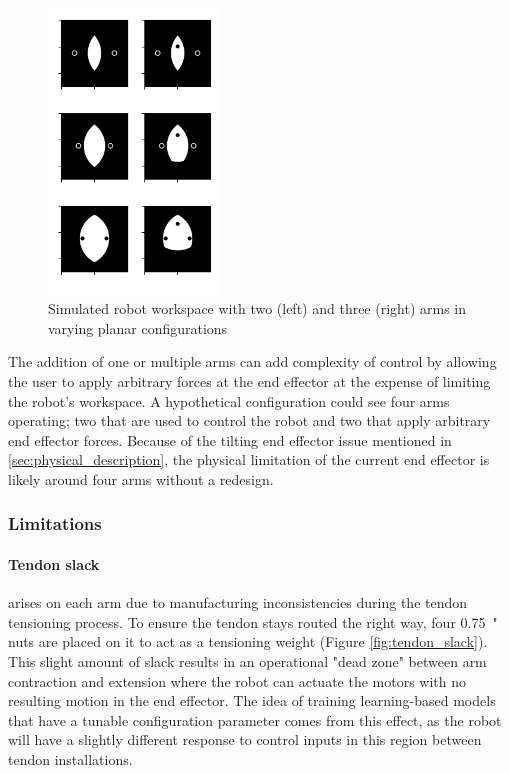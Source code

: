 \begin{figure}[h]
    \centering
    \includegraphics[width=0.4\textwidth]{images/workspaces.png}
    \caption{Simulated robot workspace with two (left) and three (right) arms in varying planar configurations}
    \label{fig:workspace_simulated}
\end{figure}

The addition of one or multiple arms can add complexity of control by allowing the user to apply arbitrary forces at the end effector at the expense of limiting the robot's workspace. A hypothetical configuration could see four arms operating; two that are used to control the robot and two that apply arbitrary end effector forces. Because of the tilting end effector issue mentioned in \ref{sec:physical_description}, the physical limitation of the current end effector is likely around four arms without a redesign.


\subsubsection{Limitations}
\label{sec:prototype_limitations_discussion}
\paragraph{Tendon slack} arises on each arm due to manufacturing inconsistencies during the tendon tensioning process. To ensure the tendon stays routed the right way, four \SI{0.75}{"} nuts are placed on it to act as a tensioning weight (Figure \ref{fig:tendon_slack}). This slight amount of slack results in an operational "dead zone" between arm contraction and extension where the robot can actuate the motors with no resulting motion in the end effector. The idea of training learning-based models that have a tunable configuration parameter comes from this effect, as the robot will have a slightly different response to control inputs in this region between tendon installations. 

